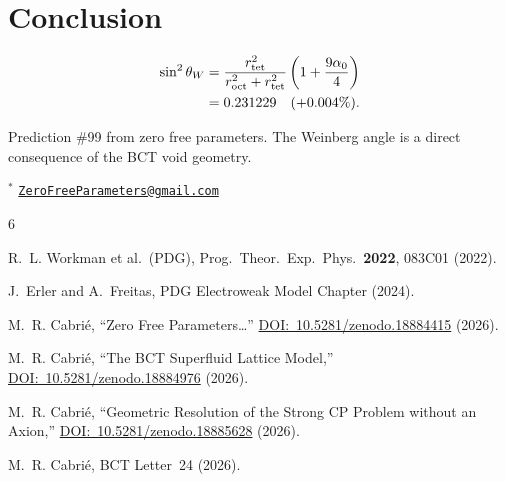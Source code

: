 \documentclass[10pt,twocolumn]{article}
\begin{document}
\section{Conclusion}

\begin{align}
\sin^2\theta_W
  &= \frac{r_{\rm tet}^2}{r_{\rm oct}^2 + r_{\rm tet}^2}
    \left(1 + \frac{9\alpha_0}{4}\right) \notag\\
  &= 0.231229\quad(+0.004\%).
\label{eq:final}
\end{align}

Prediction \#99 from zero free parameters. The Weinberg angle is a direct consequence of the
BCT void geometry.

\bigskip
\noindent$^*$ \href{mailto:ZeroFreeParameters@gmail.com}{\texttt{ZeroFreeParameters@gmail.com}}

\begin{thebibliography}{6}

R.~L. Workman et al.\ (PDG), Prog.\ Theor.\ Exp.\ Phys.\ \textbf{2022}, 083C01 (2022).

J.~Erler and A.~Freitas, PDG Electroweak Model Chapter (2024).

M.~R. Cabri\'{e}, ``Zero Free Parameters\ldots'' \href{https://doi.org/10.5281/zenodo.18884415}{DOI:~10.5281/zenodo.18884415} (2026).

M.~R. Cabri\'{e}, ``The BCT Superfluid Lattice Model,'' \href{https://doi.org/10.5281/zenodo.18884976}{DOI:~10.5281/zenodo.18884976} (2026).

M.~R. Cabri\'{e}, ``Geometric Resolution of the Strong CP Problem without an Axion,''
\href{https://doi.org/10.5281/zenodo.18885628}{DOI:~10.5281/zenodo.18885628} (2026).

M.~R. Cabri\'{e}, BCT Letter~24 (2026).

\end{thebibliography}
\end{document}
